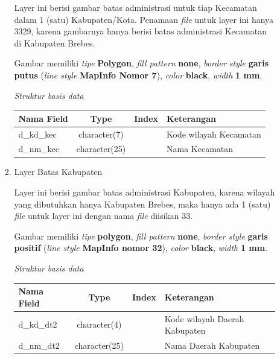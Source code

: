 \begin{enumerate}[\bfseries A.]
\begin{enumerate}[1.]
\begin{enumerate}[1.]
      Layer ini berisi gambar batas administrasi untuk tiap Kecamatan dalam 1 (satu) Kabupaten/Kota. Penamaan \textit{file} untuk layer ini hanya 3329, karena gambarnya hanya berisi batas administrasi Kecamatan di Kabupaten Brebes.
      
      Gambar memiliki \textit{tipe} \textbf{Polygon}, \textit{fill pattern} \textbf{none}, \textit{border style} \textbf{garis putus} (\textit{line style} \textbf{MapInfo Nomor 7}), \textit{color} \textbf{black}, \textit{width} \textbf{1 mm}.
      
      \textit{Struktur basis data}
      
      \begin{tabular}{| l | c | c | p{5cm} | }
        \hline
        Nama Field & Type & Index & Keterangan \\
        \hline
        d\_kd\_kec & character(7) & & Kode wilayah Kecamatan \\
        \hline
        d\_nm\_kec & character(25) & & Nama Kecamatan \\
        \hline
      \end{tabular}
      
      \item Layer Batas Kabupaten
      
      Layer ini berisi gambar batas administrasi Kabupaten, karena wilayah yang dibutuhkan hanya Kabupaten Brebes, maka hanya ada 1 (satu) \textit{file} untuk layer ini dengan nama \textit{file} diisikan 33.
      
      Gambar memiliki \textit{tipe} \textbf{polygon}, \textit{fill pattern} \textbf{none}, \textit{border style} \textbf{garis positif} (\textit{line style} \textbf{MapInfo nomor 32}), \textit{color} \textbf{black}, \textit{width} \textbf{1 mm}.
      
      \textit{Struktur basis data}
      
      \begin{tabular}{| l | c | c | p{5cm} |}
        \hline
        Nama Field & Type & Index & Keterangan \\
        \hline
        d\_kd\_dt2 & character(4) & & Kode wilayah Daerah Kabupaten \\
        \hline
        d\_nm\_dt2 & character(25) & & Nama Daerah Kabupaten \\
        \hline
      \end{tabular}
      
    \end{enumerate}
  

\end{enumerate}
\end{enumerate}
